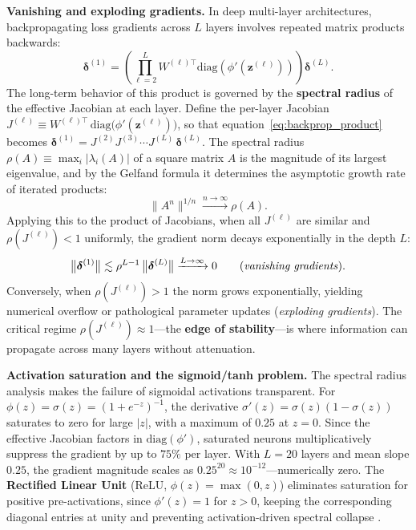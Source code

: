 \documentclass[11pt,a4paper]{article}
\begin{document}
	\textbf{Vanishing and exploding gradients.} In deep multi-layer architectures, backpropagating loss gradients across $L$ layers involves repeated matrix products backwards:
	\begin{equation}\label{eq:backprop_product}
		\boldsymbol{\delta}^{(1)} = \left( \prod_{\ell=2}^{L} W^{(\ell)\top} \mathrm{diag}\!\left(\phi'\!\left(\mathbf{z}^{(\ell)}\right)\right) \right) \boldsymbol{\delta}^{(L)}.
	\end{equation}
	The long-term behavior of this product is governed by the \textbf{spectral radius} of the effective Jacobian at each layer. Define the per-layer Jacobian $J^{(\ell)} \equiv W^{(\ell)\top}\,\mathrm{diag}\!\bigl(\phi'(\mathbf{z}^{(\ell)})\bigr)$, so that equation~\eqref{eq:backprop_product} becomes $\boldsymbol{\delta}^{(1)} = J^{(2)} J^{(3)} \cdots J^{(L)} \, \boldsymbol{\delta}^{(L)}$. The spectral radius $\rho(A) \equiv \max_i |\lambda_i(A)|$ of a square matrix $A$ is the magnitude of its largest eigenvalue, and by the Gelfand formula it determines the asymptotic growth rate of iterated products:
	\begin{equation}
		\bigl\| A^n \bigr\|^{1/n} \xrightarrow{n\to\infty} \rho(A).
	\end{equation}
	Applying this to the product of Jacobians, when all $J^{(\ell)}$ are similar and $\rho(J^{(\ell)}) < 1$ uniformly, the gradient norm decays exponentially in the depth $L$:
	\begin{equation}
		\bigl\|\boldsymbol{\delta}^{(1)}\bigr\| \lesssim \rho^{L-1}\,\bigl\|\boldsymbol{\delta}^{(L)}\bigr\| \xrightarrow{L\to\infty} 0 \qquad (\text{\emph{vanishing gradients}}).
	\end{equation}
	Conversely, when $\rho(J^{(\ell)}) > 1$ the norm grows exponentially, yielding numerical overflow or pathological parameter updates (\emph{exploding gradients}). The critical regime $\rho(J^{(\ell)}) \approx 1$---the \textbf{edge of stability}---is where information can propagate across many layers without attenuation.

	\textbf{Activation saturation and the sigmoid/tanh problem.} The spectral radius analysis makes the failure of sigmoidal activations transparent. For $\phi(z) = \sigma(z) = (1+e^{-z})^{-1}$, the derivative $\sigma'(z) = \sigma(z)(1-\sigma(z))$ saturates to zero for large $|z|$, with a maximum of $0.25$ at $z=0$. Since the effective Jacobian factors in $\mathrm{diag}(\phi')$, saturated neurons multiplicatively suppress the gradient by up to $75\%$ per layer. With $L=20$ layers and mean slope $0.25$, the gradient magnitude scales as $0.25^{20} \approx 10^{-12}$---numerically zero. The \textbf{Rectified Linear Unit} (ReLU, $\phi(z)=\max(0,z)$) eliminates saturation for positive pre-activations, since $\phi'(z)=1$ for $z>0$, keeping the corresponding diagonal entries at unity and preventing activation-driven spectral collapse \parencite{glorot2010}.
\end{document}
